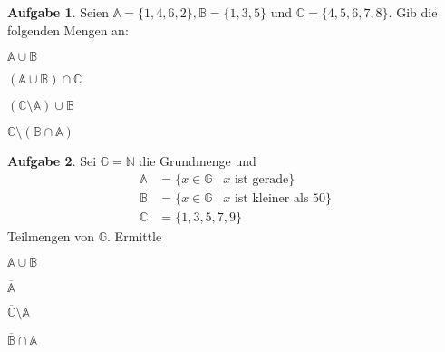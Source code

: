 \documentclass[11pt,a4paper]{article}
\title{}
\date{\today}
\author{Tina Furer}
\newcommand{\C}{\mathbb{C}}
\newcommand{\N}{\mathbb{N}}
\newcommand{\A}{\mathbb{A}}
\newcommand{\B}{\mathbb{B}}
\newcommand{\G}{\mathbb{G}}
\theoremstyle{definition}
\newtheorem{aufg}{Aufgabe}
\begin{document}
\begin{aufg}
	Seien $\A=\{1,4,6,2\}, \B=\{1,3,5\}$ und $\C=\{4,5,6,7,8\}$. Gib die folgenden Mengen an:
	\begin{enumerate}[label=(\alph*)]
	\end{enumerate}
\end{aufg}
\begin{aufg}
	Sei $\G=\N$ die Grundmenge und 
	\begin{align*}
		\A &= \{x\in\G\mid x \text{ ist gerade}\}\\
		\B &= \{x\in\G\mid x \text{ ist kleiner als } 50\}\\
		\C &= \{1,3,5,7,9\}
	\end{align*}
	Teilmengen von $\G$. Ermittle
	\begin{enumerate}[label=(\alph*)]
		\begin{multicols}{4}
			\item $\A\cup\B$
			\item $\overline{\A}$
			\item $\overline{\C}\setminus\A$
			\item $\overline{\B}\cap\A$
		\end{multicols}
	\end{enumerate}
	
\end{aufg}
\end{document}
